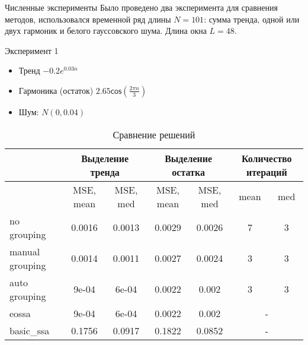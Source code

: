 \documentclass[ucs, notheorems, handout]{beamer}
\begin{document}
\begin{frame}{Численные эксперименты}
\small
    Было проведено два эксперимента для сравнения методов, использовался временной ряд длины $N = 101$: сумма тренда, одной или двух гармоник и белого гауссовского шума. Длина окна $L = 48$.
    
    Эксперимент 1
    \begin{itemize}
        \item Тренд $-0.2 e^{0.03n}$
        \item Гармоника (остаток) $2.65 \mathsf{cos}(\frac{2\pi n}{3})$
        \item Шум: ${N}(0, 0.04)$
    \end{itemize}
    
\begin{table}[h]
\tiny
\caption{\footnotesize Сравнение решений}
\begin{center}
\tabcolsep=0.11cm
\begin{tabular}{|l | c| c| c| c| c| c|}
\hline
 & \multicolumn{2}{c|}{Выделение тренда} & \multicolumn{2}{c|}{Выделение остатка} & \multicolumn{2}{c|}{Количество итераций} \\
 \hline
 & MSE, mean & MSE, med & MSE, mean & MSE, med & mean & med  \\
\hline
no grouping & 0.0016 &  0.0013 & 0.0029 &  0.0026 & 7 & 3 \\
manual grouping &  0.0014 & 0.0011 & 0.0027 & 0.0024 & 3 & 3 \\
auto grouping &  9e-04 & 6e-04 & 0.0022 & 0.002 & 3 & 3 \\
\hline
eossa & 9e-04 & 6e-04 & 0.0022 & 0.002 & \multicolumn{2}{c|}{-} \\
basic\_ssa &  0.1756 & 0.0917 & 0.1822 & 0.0852  & \multicolumn{2}{c|}{-} \\
\hline
\end{tabular}
\end{center}
\end{table}
    
\end{frame}
\end{document}
